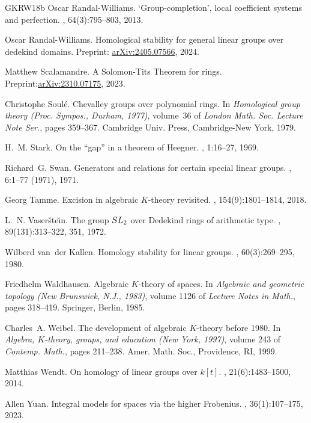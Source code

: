 \documentclass[12pt, reqno]{amsart}
\theoremstyle{plain}
\theoremstyle{definition}
\begin{document}
\begin{thebibliography}{GKRW18b}
Oscar Randal-Williams.
\newblock `{G}roup-completion', local coefficient systems and perfection.
, 64(3):795--803, 2013.

Oscar Randal-Williams.
\newblock Homological stability for general linear groups over dedekind
  domains.
\newblock Preprint:
  \href{https://arxiv.org/abs/math/2405.07566}{arXiv:2405.07566}, 2024.

Matthew Scalamandre.
\newblock A {S}olomon-{T}its {T}heorem for rings.
\newblock
  Preprint:\href{https://arxiv.org/pdf/2310.07175.pdf}{arXiv:2310.07175}, 2023.

Christophe Soul\'{e}.
\newblock Chevalley groups over polynomial rings.
\newblock In {\em Homological group theory ({P}roc. {S}ympos., {D}urham,
  1977)}, volume~36 of {\em London Math. Soc. Lecture Note Ser.}, pages
  359--367. Cambridge Univ. Press, Cambridge-New York, 1979.

H.~M. Stark.
\newblock On the ``gap'' in a theorem of {H}eegner.
, 1:16--27, 1969.

Richard~G. Swan.
\newblock Generators and relations for certain special linear groups.
, 6:1--77 (1971), 1971.

Georg Tamme.
\newblock Excision in algebraic {$K$}-theory revisited.
, 154(9):1801--1814, 2018.

L.~N. Vaser\v{s}te\u{\i}n.
\newblock The group {$SL\sb{2}$} over {D}edekind rings of arithmetic type.
, 89(131):313--322, 351, 1972.

Wilberd van~der Kallen.
\newblock Homology stability for linear groups.
, 60(3):269--295, 1980.

Friedhelm Waldhausen.
\newblock Algebraic {$K$}-theory of spaces.
\newblock In {\em Algebraic and geometric topology ({N}ew {B}runswick,
  {N}.{J}., 1983)}, volume 1126 of {\em Lecture Notes in Math.}, pages
  318--419. Springer, Berlin, 1985.

Charles~A. Weibel.
\newblock The development of algebraic {$K$}-theory before 1980.
\newblock In {\em Algebra, {$K$}-theory, groups, and education ({N}ew {Y}ork,
  1997)}, volume 243 of {\em Contemp. Math.}, pages 211--238. Amer. Math. Soc.,
  Providence, RI, 1999.

Matthias Wendt.
\newblock On homology of linear groups over {$k[t]$}.
, 21(6):1483--1500, 2014.

Allen Yuan.
\newblock Integral models for spaces via the higher {F}robenius.
, 36(1):107--175, 2023.

\end{thebibliography}
\end{document}
